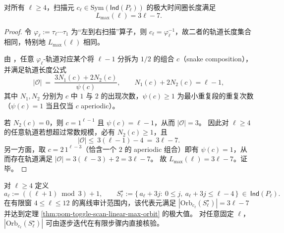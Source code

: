\begin{theorem}\label{thm:pom-toggle-scan-linear-max-orbit}
对所有 \(\ell\ge 4\)，扫描元 \(c_\ell\in\mathrm{Sym}(\mathsf{Ind}(P_\ell))\) 的极大时间圈长度满足
\[
L_{\max}(\ell)=3\ell-7.
\]
\end{theorem}
\begin{proof}
令 \(\varphi_\ell:=\tau_\ell\cdots\tau_1\) 为“左到右扫描”算子，则 \(c_\ell=\varphi_\ell^{-1}\)，故二者的轨道长度集合相同，特别地 \(L_{\max}(\ell)\) 相同。

由 \cite[Def.~4.1 \& Prop.~4.3]{JosephRoby2018TogglingIndependentSetsPath}，任意 \(\varphi_\ell\)-轨道对应某个将 \(\ell-1\) 分拆为 \(1/2\) 的组合 \(c\)（snake composition），并满足轨道长度公式
\[
|\mathcal O|
\ =\
\frac{3N_1(c)+2N_2(c)}{\psi(c)},
\qquad
N_1(c)+2N_2(c)=\ell-1,
\]
其中 \(N_1,N_2\) 分别为 \(c\) 中 \(1\) 与 \(2\) 的出现次数，\(\psi(c)\ge 1\) 为最小重复段的重复次数（\(\psi(c)=1\) 当且仅当 \(c\) aperiodic）。

若 \(N_2(c)=0\)，则 \(c=1^{\ell-1}\) 且 \(\psi(c)=\ell-1\)，从而 \(|\mathcal O|=3\)。
因此对 \(\ell\ge 4\) 的任意轨道若想超过常数规模，必有 \(N_2(c)\ge 1\)，且
\[
|\mathcal O|
\le\
3(\ell-1)-4
\ =\
3\ell-7.
\]
另一方面，取 \(c=2\,1^{\ell-3}\)（恰含一个 \(2\) 的 aperiodic 组合）即有 \(\psi(c)=1\)，从而存在轨道满足
\(
|\mathcal O|=3(\ell-3)+2=3\ell-7
\)。
故 \(L_{\max}(\ell)=3\ell-7\)。证毕。
\end{proof}

\begin{remark}\label{rem:pom-toggle-scan-explicit-long-orbit}
对 \(\ell\ge 4\) 定义
\[
a_\ell:=((\ell+1)\bmod 3)+1,
\qquad
S_\ell^\star:=\{\,a_\ell+3j:\ 0\le j,\ a_\ell+3j\le \ell-4\,\}\ \in\ \mathsf{Ind}(P_\ell).
\]
在有限窗 \(4\le \ell\le 12\) 的离线审计范围内，该代表元满足
\(
|\mathrm{Orb}_{c_\ell}(S_\ell^\star)|=3\ell-7
\)
并达到定理 \ref{thm:pom-toggle-scan-linear-max-orbit} 的极大值。
对任意固定 \(\ell\)，\(|\mathrm{Orb}_{c_\ell}(S_\ell^\star)|\) 可由逐步迭代在有限步骤内直接核验。
\end{remark}

